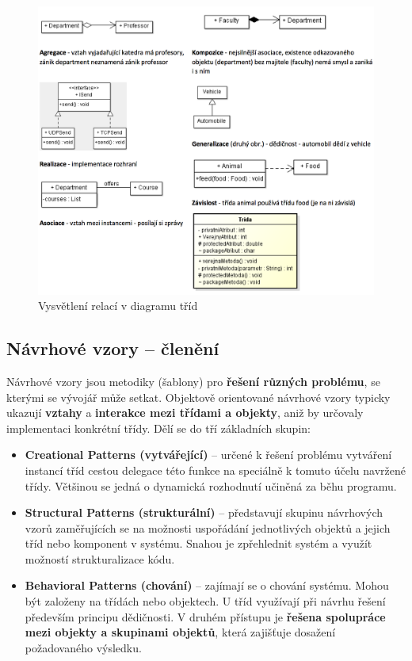 \begin{figure}[H]
	\centering
	\includegraphics[width=.4\textwidth]{assets/class.png}
	\caption{Vysvětlení relací v diagramu tříd}
\end{figure}

\subsection{Návrhové vzory -- členění}
Návrhové vzory jsou metodiky (šablony) pro \textbf{řešení různých problému}, se kterými se vývojář může setkat. Objektově orientované návrhové vzory typicky ukazují \textbf{vztahy} a \textbf{interakce mezi třídami a objekty}, aniž by určovaly implementaci konkrétní třídy. Dělí se do tří základních skupin:
\begin{itemize}
\item \textbf{Creational Patterns (vytvářející)} -- určené k řešení problému vytváření instancí tříd cestou delegace této funkce na speciálně k tomuto účelu navržené třídy. Většinou se jedná o dynamická rozhodnutí učiněná za běhu programu.
\item \textbf{Structural Patterns (strukturální)} -- představují skupinu návrhových vzorů zaměřujících se na možnosti uspořádání jednotlivých objektů a jejich tříd nebo komponent v systému. Snahou je zpřehlednit systém a využít možností strukturalizace kódu.
\item \textbf{Behavioral Patterns (chování)} -- zajímají se o chování systému. Mohou být založeny na třídách nebo objektech. U tříd využívají při návrhu řešení především principu dědičnosti. V druhém přístupu je \textbf{řešena spolupráce mezi objekty a skupinami objektů}, která zajišťuje dosažení požadovaného výsledku.
\end{itemize}


